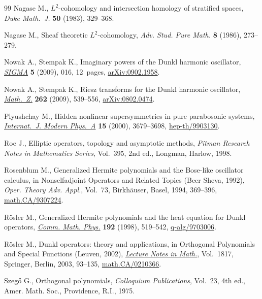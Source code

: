 \documentclass[pdftex]{sigma}
\begin{document}
\begin{thebibliography}{99}
Nagase M., {$L^{2}$}-cohomology and intersection homology of stratif\/ied spaces,
\textit{Duke Math.~J.} \textbf{50} (1983), 329--368.

Nagase M., Sheaf theoretic {$L^2$}-cohomology, \textit{Adv. Stud. Pure Math.}
  \textbf{8} (1986), 273--279.

Nowak A., Stempak K., Imaginary powers of the {D}unkl harmonic oscillator,
  \href{http://dx.doi.org/10.3842/SIGMA.2009.016}{\textit{SIGMA}} \textbf{5} (2009), 016, 12~pages, \href{http://arxiv.org/abs/0902.1958}{arXiv:0902.1958}.

Nowak A., Stempak K., Riesz transforms for the {D}unkl harmonic oscillator,
  \href{http://dx.doi.org/10.1007/s00209-008-0388-4}{\textit{Math.~Z.}} \textbf{262} (2009), 539--556, \href{http://arxiv.org/abs/0802.0474}{arXiv:0802.0474}.

Plyushchay M., Hidden nonlinear supersymmetries in pure parabosonic systems,
  \href{http://dx.doi.org/10.1142/S0217751X0000198X}{\textit{Internat.~J. Modern Phys.~A}} \textbf{15} (2000), 3679--3698,
  \href{http://arxiv.org/abs/hep-th/9903130}{hep-th/9903130}.

Roe J., Elliptic operators, topology and asymptotic methods, \textit{Pitman
  Research Notes in Mathematics Series}, Vol.~395, 2nd ed., Longman, Harlow,
  1998.

Rosenblum M., Generalized {H}ermite polynomials and the {B}ose-like oscillator
  calculus, in Nonselfadjoint Operators and Related Topics ({B}eer {S}heva,
  1992), \textit{Oper. Theory Adv. Appl.}, Vol.~73, Birkh\"auser, Basel, 1994,
  369--396, \href{http://arxiv.org/abs/math.CA/9307224}{math.CA/9307224}.

R{\"o}sler M., Generalized {H}ermite polynomials and the heat equation for
  {D}unkl operators, \href{http://dx.doi.org/10.1007/s002200050307}{\textit{Comm. Math. Phys.}} \textbf{192} (1998), 519--542,
  \href{http://arxiv.org/abs/q-alg/9703006}{q-alg/9703006}.

R{\"o}sler M., Dunkl operators: theory and applications, in Orthogonal
  Polynomials and Special Functions ({L}euven, 2002), \href{http://dx.doi.org/10.1007/3-540-44945-0_3}{\textit{Lecture Notes in
  Math.}}, Vol.~1817, Springer, Berlin, 2003, 93--135,
  \href{http://arxiv.org/abs/math.CA/0210366}{math.CA/0210366}.

Szeg{\H{o}} G., Orthogonal polynomials, \textit{Colloquium Publications},
  Vol.~23, 4th ed., Amer. Math. Soc., Providence, R.I., 1975.


\end{thebibliography}
\end{document}
